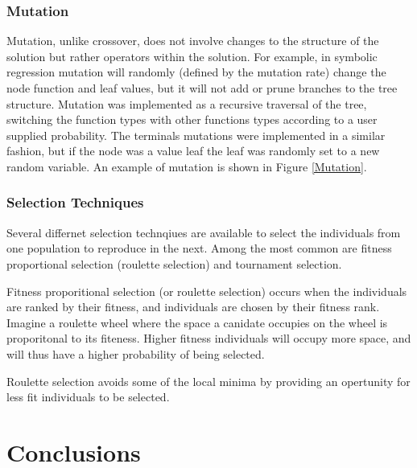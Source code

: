 \begin{itemize}
\subsubsection{Mutation}

Mutation, unlike crossover, does not involve changes to the structure
of the solution but rather operators within the solution. For example,
in symbolic regression mutation will randomly (defined by the mutation
rate) change the node function and leaf values, but it will not add
or prune branches to the tree structure. Mutation was implemented
as a recursive traversal of the tree, switching the function types
with other functions types according to a user supplied probability.
The terminals mutations were implemented in a similar fashion, but
if the node was a value leaf the leaf was randomly set to a new random
variable. An example of mutation is shown in Figure \ref{Mutation}.

\subsubsection{Selection Techniques}
Several differnet selection technqiues are available to select the individuals from one population to reproduce in the next.
Among the most common are fitness proportional selection (roulette selection) and tournament selection.

Fitness proporitional selection (or roulette selection) occurs when the individuals are ranked by their fitness, and individuals are chosen by their fitness rank.
Imagine a roulette wheel where the space a canidate occupies on the wheel is proporitonal to its fiteness.  
Higher fitness individuals will occupy more space, and will thus have a higher probability of being selected.

Roulette selection avoids some of the local minima by providing an opertunity for less fit individuals to be selected.

\section{Conclusions}


\end{itemize}
